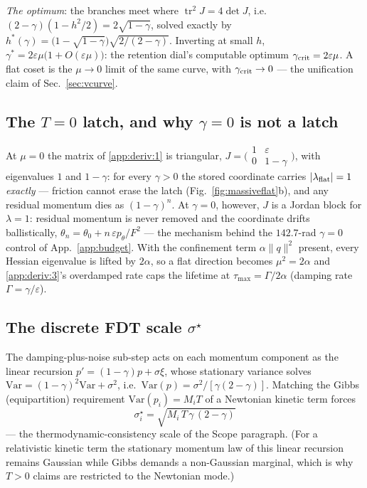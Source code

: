 \documentclass{article}
\begin{document}
\emph{The optimum}: the branches meet where $\operatorname{tr}^2J=4\det J$, i.e.\ $(2-\gamma)(1-h^2/2)=2\sqrt{1-\gamma}$, solved exactly by $h^\ast(\gamma)=\bigl(1-\sqrt{1-\gamma}\bigr)\sqrt{2/(2-\gamma)}$. Inverting at small $h$, $\gamma^\ast=2\varepsilon\mu\bigl(1+O(\varepsilon\mu)\bigr)$: the retention dial's computable optimum $\gamma_{\rm crit}=2\varepsilon\mu$. A flat coset is the $\mu\to0$ limit of the same curve, with $\gamma_{\rm crit}\to0$ --- the unification claim of Sec.~\ref{sec:vcurve}.

\subsection{The $T=0$ latch, and why $\gamma=0$ is not a latch}\label{app:deriv:4} At $\mu=0$ the matrix of \ref{app:deriv:1} is triangular, $J=\bigl(\begin{smallmatrix}1&\varepsilon\\0&1-\gamma\end{smallmatrix}\bigr)$, with eigenvalues $1$ and $1-\gamma$: for every $\gamma>0$ the stored coordinate carries $|\lambda_{\rm flat}|=1$ \emph{exactly} --- friction cannot erase the latch (Fig.~\ref{fig:massiveflat}b), and any residual momentum dies as $(1-\gamma)^n$. At $\gamma=0$, however, $J$ is a Jordan block for $\lambda=1$: residual momentum is never removed and the coordinate drifts ballistically, $\theta_n=\theta_0+n\,\varepsilon p_\theta/F^2$ --- the mechanism behind the $142.7$-rad $\gamma=0$ control of App.~\ref{app:budget}. With the confinement term $\alpha\|q\|^2$ present, every Hessian eigenvalue is lifted by $2\alpha$, so a flat direction becomes $\mu^2=2\alpha$ and \ref{app:deriv:3}'s overdamped rate caps the lifetime at $\tau_{\max}=\Gamma/2\alpha$ (damping rate $\Gamma=\gamma/\varepsilon$).

\subsection{The discrete FDT scale $\sigma^\star$}\label{app:deriv:5} The damping-plus-noise sub-step acts on each momentum component as the linear recursion $p'=(1-\gamma)p+\sigma\xi$, whose stationary variance solves $\mathrm{Var}=(1-\gamma)^2\mathrm{Var}+\sigma^2$, i.e.\ $\mathrm{Var}(p)=\sigma^2/[\gamma(2-\gamma)]$. Matching the Gibbs (equipartition) requirement $\mathrm{Var}(p_i)=M_iT$ of a Newtonian kinetic term forces
\[
\sigma^\star_i=\sqrt{M_i\,T\,\gamma\,(2-\gamma)}
\]
--- the thermodynamic-consistency scale of the Scope paragraph. (For a relativistic kinetic term the stationary momentum law of this linear recursion remains Gaussian while Gibbs demands a non-Gaussian marginal, which is why $T>0$ claims are restricted to the Newtonian mode.)
\end{document}
